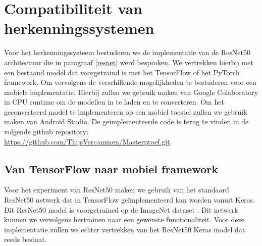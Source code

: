 \chapter{Compatibiliteit van herkenningssystemen}
Voor het herkenningssysteem bestuderen we de implementatie van de ResNet50 architectuur die in paragraaf \ref{resnet} werd besproken.
We vertrekken hierbij met een bestaand model dat voorgetraind is met het TensorFlow of het PyTorch framework.
Om vervolgens de verschillende mogelijkheden te bestuderen voor een mobiele implementatie.
Hierbij zullen we gebruik maken van Google Colaboratory in CPU runtime om de modellen in te laden en te converteren.
Om het geconverteerd model te implementeren op een mobiel toestel zullen we gebruik maken van Android Studio.
De ge\"implementeerde code is terug te vinden in de volgende github repository: \url{https://github.com/ThijsVercammen/Masterproef.git}.


\section{Van TensorFlow naar mobiel framework}
Voor het experiment van ResNet50 maken we gebruik van het standaard ResNet50 netwerk dat in TensorFlow ge\"implementeerd kan worden vanuit Keras.
Dit ResNet50 model is voorgetrained op de ImageNet dataset \cite{deng_2009_imagenet}. 
Dit netwerk kunnen we vervolgens hertrainen naar een gewenste functionaliteit.
Voor deze implementatie zullen we echter vertrekken van het ResNet50 Keras model dat reeds bestaat.

